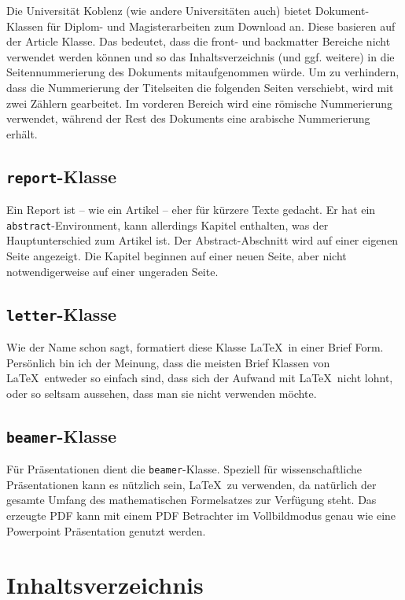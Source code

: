  Die Universität Koblenz (wie andere Universitäten auch) bietet Doku\-ment-Klassen für Diplom- und Magisterarbeiten zum Download an. Diese basieren auf der Article Klasse. Das bedeutet, dass die front- und backmatter Bereiche nicht verwendet werden können und so das Inhaltsverzeichnis (und ggf. weitere) in die Seitennummerierung des Dokuments mitaufgenommen würde. Um zu verhindern, dass die Nummerierung der Titelseiten die folgenden Seiten verschiebt, wird mit zwei Zählern gearbeitet. Im vorderen Bereich wird eine römische Nummerierung verwendet, während der Rest des Dokuments eine arabische Nummerierung erhält.


\subsection{\texttt{report}-Klasse}

Ein Report ist -- wie ein Artikel -- eher für kürzere Texte gedacht. Er hat ein \texttt{abstract}-Environment, kann allerdings Kapitel enthalten, was der Hauptunterschied zum Artikel ist. Der Abstract-Abschnitt wird auf einer eigenen Seite angezeigt. Die Kapitel beginnen auf einer neuen Seite, aber nicht notwendigerweise auf einer ungeraden Seite. 


\subsection{\texttt{letter}-Klasse}

Wie der Name schon sagt, formatiert diese Klasse \LaTeX\ in einer Brief Form. Persönlich bin ich der Meinung, dass die meisten Brief Klassen von \LaTeX\ entweder so einfach sind, dass sich der Aufwand mit \LaTeX\ nicht lohnt, oder so seltsam aussehen, dass man sie nicht verwenden möchte.

\subsection{\texttt{beamer}-Klasse}

Für Präsentationen dient die \texttt{beamer}-Klasse. Speziell für wissenschaftliche Präsentationen kann es nützlich sein, \LaTeX\ zu verwenden, da natürlich der gesamte Umfang des mathematischen Formelsatzes zur Verfügung steht. Das erzeugte PDF kann mit einem PDF Betrachter im Vollbildmodus genau wie eine Powerpoint Präsentation genutzt werden. 


\section{Inhaltsverzeichnis}\label{chap:content}

